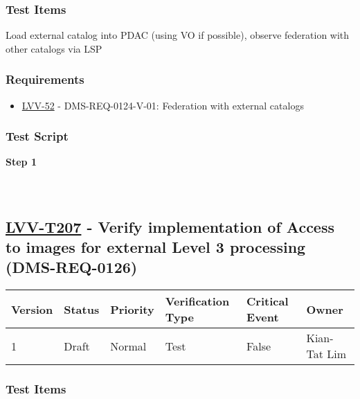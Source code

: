 \hypertarget{test-items-182}{%
\subsubsection{Test Items}\label{test-items-182}}

Load external catalog into PDAC (using VO if possible), observe
federation with other catalogs via LSP

\hypertarget{requirements-183}{%
\subsubsection{Requirements}\label{requirements-183}}

\begin{itemize}
\tightlist
\item
  \href{https://jira.lsstcorp.org/browse/LVV-52}{LVV-52} -
  DMS-REQ-0124-V-01: Federation with external catalogs
\end{itemize}

\hypertarget{test-script-183}{%
\subsubsection{Test Script}\label{test-script-183}}

\textbf{Step 1}\\
~\\
~\\

\hypertarget{lvv-t207---verify-implementation-of-access-to-images-for-external-level-3-processing-dms-req-0126}{%
\subsection{\texorpdfstring{\href{https://jira.lsstcorp.org/secure/Tests.jspa\#/testCase/LVV-T207}{LVV-T207}
- Verify implementation of Access to images for external Level 3
processing
(DMS-REQ-0126)}{LVV-T207 - Verify implementation of Access to images for external Level 3 processing (DMS-REQ-0126)}}\label{lvv-t207---verify-implementation-of-access-to-images-for-external-level-3-processing-dms-req-0126}}

\begin{longtable}[]{@{}llllll@{}}
\toprule
Version & Status & Priority & Verification Type & Critical Event &
Owner\tabularnewline
\midrule
\endhead
1 & Draft & Normal & Test & False & Kian-Tat Lim\tabularnewline
\bottomrule
\end{longtable}

\hypertarget{test-items-183}{%
\subsubsection{Test Items}\label{test-items-183}}

